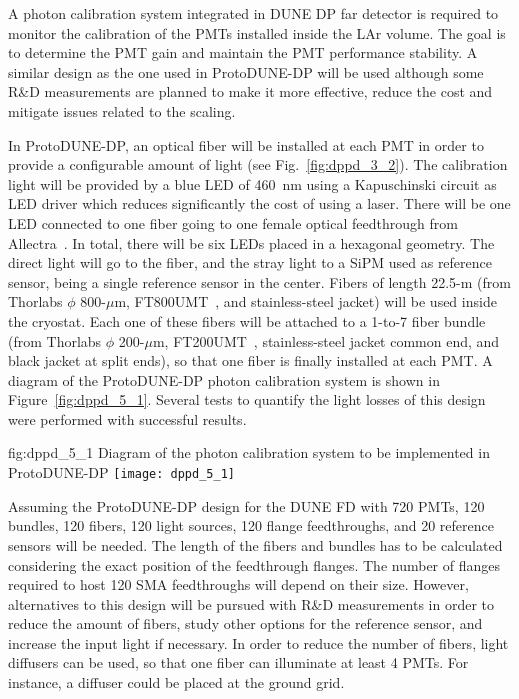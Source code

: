 A photon calibration system integrated in DUNE DP far detector is required to monitor the calibration of the PMTs installed inside the LAr volume. The goal is to determine the PMT gain and maintain the PMT performance stability. A similar design as the one used in ProtoDUNE-DP will be used although some R\&D measurements are planned to make it more effective, reduce the cost and mitigate issues related to the scaling.

In ProtoDUNE-DP, an optical fiber will be installed at each PMT in order to provide a configurable amount of light (see Fig.~\ref{fig:dppd_3_2}). The calibration light will be provided by a blue LED of \SI{460}{nm} using a Kapuschinski circuit as LED driver which reduces significantly the cost of using a laser. There will be one LED connected to one fiber going to one female optical feedthrough from Allectra~\cite{allectra}. In total,  there will be six LEDs placed in a hexagonal geometry. The direct light will go to the fiber, and the stray light to a SiPM used as reference sensor, being a single reference sensor in the center. Fibers of length 22.5-m (from Thorlabs $\phi$ 800-$\mu$m, FT800UMT~\cite{ft800umt}, and stainless-steel jacket) will be used inside the cryostat. Each one of these fibers will be attached to a 1-to-7 fiber bundle (from Thorlabs $\phi$ 200-$\mu$m, FT200UMT~\cite{ft200umt}, stainless-steel jacket common end, and black jacket at split ends), so that one fiber is finally installed at each PMT. A diagram of the ProtoDUNE-DP photon calibration system is shown in Figure~\ref{fig:dppd_5_1}. Several tests to quantify the light losses of this design were performed with successful results. 

\begin{dunefigure}{fig:dppd_5_1}
{Diagram of the photon calibration system to be implemented in ProtoDUNE-DP}
\texttt{[image: dppd\_5\_1]}
\end{dunefigure}

Assuming the ProtoDUNE-DP design for the DUNE FD with \num{720} PMTs, \num{120} bundles, \num{120} fibers, \num{120} light sources, \num{120} flange feedthroughs, and \num{20} reference sensors will be needed. The length of the fibers and bundles has to be calculated considering the exact position of the feedthrough flanges. The number of flanges required to host \num{120} SMA feedthroughs will depend on their size. However, alternatives to this design will be pursued with R\&D measurements in order to reduce the amount of fibers, study other options for the reference sensor, and increase the input light if necessary. In order to reduce the number of fibers, light diffusers can be used, so that one fiber can illuminate at least \num{4} PMTs. For instance, a diffuser could be placed at the ground grid. 

